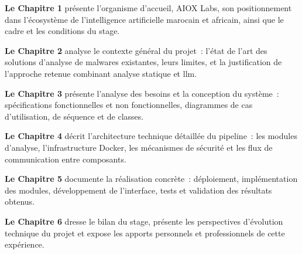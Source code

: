 \textbf{Le Chapitre 1} présente l'organisme d'accueil, AIOX Labs, son positionnement dans l'écosystème de l'intelligence artificielle marocain et africain, ainsi que le cadre et les conditions du stage.

\textbf{Le Chapitre 2} analyse le contexte général du projet~: l'état de l'art des solutions d'analyse de malwares existantes, leurs limites, et la justification de l'approche retenue combinant analyse statique et \acrshort{llm}.

\textbf{Le Chapitre 3} présente l'analyse des besoins et la conception du système~: spécifications fonctionnelles et non fonctionnelles, diagrammes de cas d'utilisation, de séquence et de classes.

\textbf{Le Chapitre 4} décrit l'architecture technique détaillée du pipeline~: les modules d'analyse, l'infrastructure Docker, les mécanismes de sécurité et les flux de communication entre composants.

\textbf{Le Chapitre 5} documente la réalisation concrète~: déploiement, implémentation des modules, développement de l'interface, tests et validation des résultats obtenus.

\textbf{Le Chapitre 6} dresse le bilan du stage, présente les perspectives d'évolution technique du projet et expose les apports personnels et professionnels de cette expérience.
